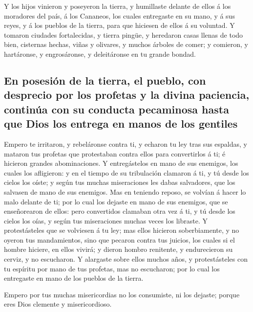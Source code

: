  Y los hijos vinieron y poseyeron la tierra, y humillaste
delante de ellos á los moradores del país, á los Cananeos, los cuales
entregaste en su mano, y á sus reyes, y á los pueblos de la tierra, para
que hiciesen de ellos á su voluntad.  Y tomaron ciudades
fortalecidas, y tierra pingüe, y heredaron casas llenas de todo bien,
cisternas hechas, viñas y olivares, y muchos árboles de comer; y
comieron, y hartáronse, y engrosáronse, y deleitáronse en tu grande
bondad.

\hypertarget{en-posesiuxf3n-de-la-tierra-el-pueblo-con-desprecio-por-los-profetas-y-la-divina-paciencia-continuxfaa-con-su-conducta-pecaminosa-hasta-que-dios-los-entrega-en-manos-de-los-gentiles}{%
\subsection{En posesión de la tierra, el pueblo, con desprecio por los
profetas y la divina paciencia, continúa con su conducta pecaminosa
hasta que Dios los entrega en manos de los
gentiles}\label{en-posesiuxf3n-de-la-tierra-el-pueblo-con-desprecio-por-los-profetas-y-la-divina-paciencia-continuxfaa-con-su-conducta-pecaminosa-hasta-que-dios-los-entrega-en-manos-de-los-gentiles}}

 Empero te irritaron, y rebeláronse contra ti, y echaron tu
ley tras sus espaldas, y mataron tus profetas que protestaban contra
ellos para convertirlos á ti; é hicieron grandes abominaciones.
 Y entregástelos en mano de sus enemigos, los cuales los
afligieron: y en el tiempo de su tribulación clamaron á ti, y tú desde
los cielos los oíste; y según tus muchas miseraciones les dabas
salvadores, que los salvasen de mano de sus enemigos.  Mas
en teniendo reposo, se volvían á hacer lo malo delante de ti; por lo
cual los dejaste en mano de sus enemigos, que se enseñorearon de ellos:
pero convertidos clamaban otra vez á ti, y tú desde los cielos los oías,
y según tus miseraciones muchas veces los libraste.  Y
protestásteles que se volviesen á tu ley; mas ellos hicieron
soberbiamente, y no oyeron tus mandamientos, sino que pecaron contra tus
juicios, los cuales si el hombre hiciere, en ellos vivirá; y dieron
hombro renitente, y endurecieron su cerviz, y no escucharon.
 Y alargaste sobre ellos muchos años, y protestásteles con
tu espíritu por mano de tus profetas, mas no escucharon; por lo cual los
entregaste en mano de los pueblos de la tierra.

 Empero por tus muchas misericordias no los consumiste, ni
los dejaste; porque eres Dios clemente y misericordioso.

